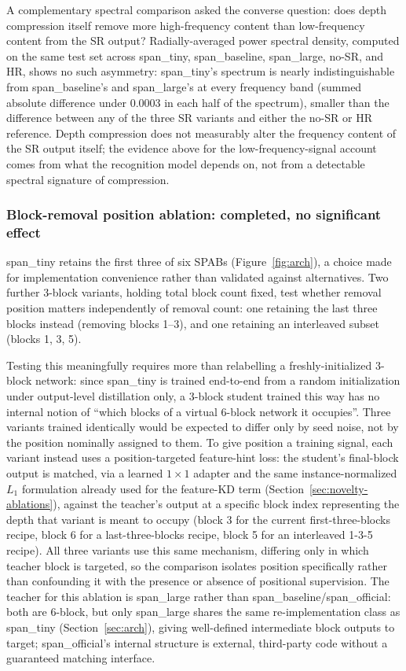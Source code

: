 \documentclass[pdflatex,sn-vancouver-num]{sn-jnl}
\begin{document}
A complementary spectral comparison asked the converse question: does depth compression itself remove more high-frequency content than low-frequency content from the SR output? Radially-averaged power spectral density, computed on the same test set across span\_tiny, span\_baseline, span\_large, no-SR, and HR, shows no such asymmetry: span\_tiny's spectrum is nearly indistinguishable from span\_baseline's and span\_large's at every frequency band (summed absolute difference under 0.0003 in each half of the spectrum), smaller than the difference between any of the three SR variants and either the no-SR or HR reference. Depth compression does not measurably alter the frequency content of the SR output itself; the evidence above for the low-frequency-signal account comes from what the recognition model depends on, not from a detectable spectral signature of compression.

\subsubsection{Block-removal position ablation: completed, no significant effect}
\label{sec:position-ablation}

span\_tiny retains the first three of six SPABs (Figure~\ref{fig:arch}), a choice made for implementation convenience rather than validated against alternatives. Two further 3-block variants, holding total block count fixed, test whether removal position matters independently of removal count: one retaining the last three blocks instead (removing blocks 1--3), and one retaining an interleaved subset (blocks 1, 3, 5).

Testing this meaningfully requires more than relabelling a freshly-initialized 3-block network: since span\_tiny is trained end-to-end from a random initialization under output-level distillation only, a 3-block student trained this way has no internal notion of ``which blocks of a virtual 6-block network it occupies''. Three variants trained identically would be expected to differ only by seed noise, not by the position nominally assigned to them. To give position a training signal, each variant instead uses a position-targeted feature-hint loss: the student's final-block output is matched, via a learned $1\times1$ adapter and the same instance-normalized $L_1$ formulation already used for the feature-KD term (Section~\ref{sec:novelty-ablations}), against the teacher's output at a specific block index representing the depth that variant is meant to occupy (block 3 for the current first-three-blocks recipe, block 6 for a last-three-blocks recipe, block 5 for an interleaved 1-3-5 recipe). All three variants use this same mechanism, differing only in which teacher block is targeted, so the comparison isolates position specifically rather than confounding it with the presence or absence of positional supervision. The teacher for this ablation is span\_large rather than span\_baseline/span\_official: both are 6-block, but only span\_large shares the same re-implementation class as span\_tiny (Section~\ref{sec:arch}), giving well-defined intermediate block outputs to target; span\_official's internal structure is external, third-party code without a guaranteed matching interface.
\end{document}
